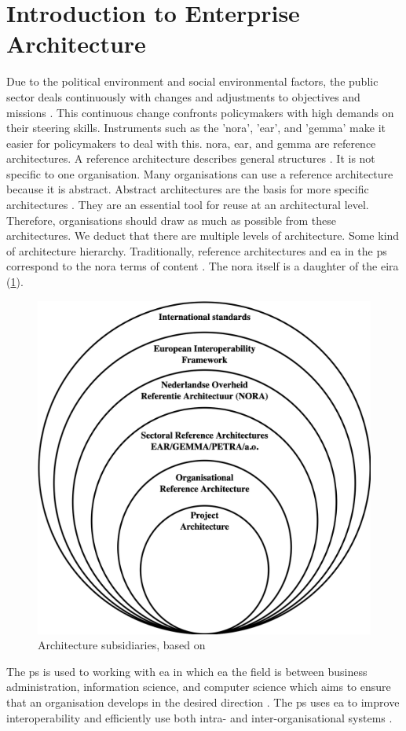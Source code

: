 \section{Introduction to Enterprise Architecture}
\label{sec:introea}
Due to the political environment and social environmental factors, the public sector deals continuously with changes and adjustments to objectives and missions \parencite{EARbaten}. This continuous change confronts policymakers with high demands on their steering skills. Instruments such as the '\acrfull{nora}', '\acrfull{ear}', and '\acrfull{gemma}' make it easier for policymakers to deal with this. \acrshort{nora}, \acrshort{ear}, and \acrshort{gemma} are reference architectures. A reference architecture describes general structures \parencite[p.~8]{Greefhorst2008}. It is not specific to one organisation. Many organisations can use a reference architecture because it is abstract. Abstract architectures are the basis for more specific architectures \parencite[p.~11]{Greefhorst2008}. They are an essential tool for reuse at an architectural level. Therefore, organisations should draw as much as possible from these architectures. We deduct that there are multiple levels of architecture. Some kind of architecture hierarchy. Traditionally, reference architectures and \acrlong{ea} in the \gls{ps} correspond to the \acrshort{nora} terms of content \parencite{NORAfamilie}. The \acrshort{nora} itself is a daughter of the \acrfull{eira} (\cref{fig:architectureviewonion}).
\begin{figure}[H]
	\centering
	\includegraphics[width=0.5\linewidth]{images/architectureviewonion}
	\caption[Architecture subsidiaries, based on \parencite{Greefhorst2008}]{Architecture subsidiaries, based on \parencite{Greefhorst2008}}
	\label{fig:architectureviewonion}
\end{figure}
The \gls{ps} is used to working with \acrlong{ea} in which \acrlong{ea} the field is between business administration, information science, and computer science which aims to ensure that an organisation develops in the desired direction \parencite{EAwiki}. The \gls{ps} uses \acrlong{ea} to improve interoperability and efficiently use both intra- and inter-organisational systems \parencite[p.~9]{Giskes2020}.


